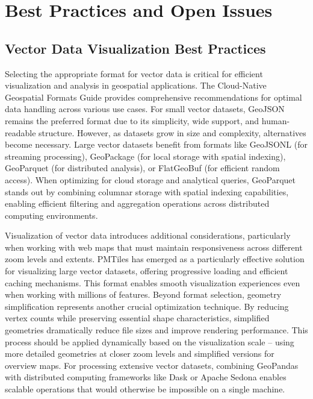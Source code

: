 \section{Best Practices and Open Issues}\label{sec:Guides}

\subsection{Vector Data Visualization Best Practices}

Selecting the appropriate format for vector data is critical for efficient visualization and analysis in geospatial applications. The Cloud-Native Geospatial Formats Guide provides comprehensive recommendations for optimal data handling across various use cases. For small vector datasets, GeoJSON remains the preferred format due to its simplicity, wide support, and human-readable structure. However, as datasets grow in size and complexity, alternatives become necessary. Large vector datasets benefit from formats like GeoJSONL (for streaming processing), GeoPackage (for local storage with spatial indexing), GeoParquet (for distributed analysis), or FlatGeoBuf (for efficient random access). When optimizing for cloud storage and analytical queries, GeoParquet stands out by combining columnar storage with spatial indexing capabilities, enabling efficient filtering and aggregation operations across distributed computing environments.

Visualization of vector data introduces additional considerations, particularly when working with web maps that must maintain responsiveness across different zoom levels and extents. PMTiles has emerged as a particularly effective solution for visualizing large vector datasets, offering progressive loading and efficient caching mechanisms. This format enables smooth visualization experiences even when working with millions of features. Beyond format selection, geometry simplification represents another crucial optimization technique. By reducing vertex counts while preserving essential shape characteristics, simplified geometries dramatically reduce file sizes and improve rendering performance. This process should be applied dynamically based on the visualization scale – using more detailed geometries at closer zoom levels and simplified versions for overview maps. For processing extensive vector datasets, combining GeoPandas with distributed computing frameworks like Dask or Apache Sedona enables scalable operations that would otherwise be impossible on a single machine.

